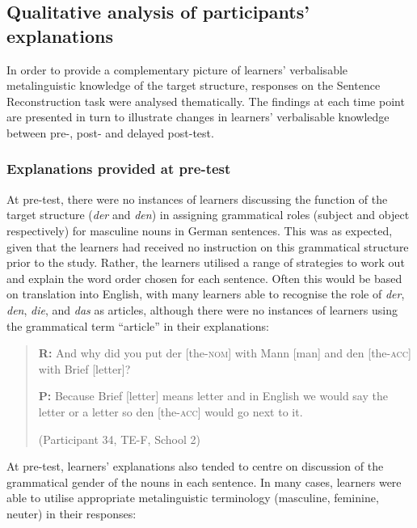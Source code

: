 \documentclass[output=paper]{langscibook}
\begin{document}
\subsection{Qualitative analysis of participants’ explanations}\largerpage[2]

In order to provide a complementary picture of learners’ verbalisable metalinguistic knowledge of the target structure, responses on the Sentence Reconstruction task were analysed thematically. The findings at each time point are presented in turn to illustrate changes in learners’ verbalisable knowledge between pre-, post- and delayed post-test.

\subsubsection{Explanations provided at pre-test}

At pre-test, there were no instances of learners discussing the function of the target structure (\textit{der} and \textit{den}) in assigning grammatical roles (subject and object respectively) for masculine nouns in German sentences. This was as expected, given that the learners had received no instruction on this grammatical structure prior to the study. Rather, the learners utilised a range of strategies to work out and explain the word order chosen for each sentence. Often this would be based on translation into English, with many learners able to recognise the role of \textit{der}, \textit{den}, \textit{die}, and \textit{das} as articles, although there were no instances of learners using the grammatical term ``article'' in their explanations:

\begin{quote}
  \textbf{R:} And why did you put der [the-\textsc{nom}] with Mann [man] and   den [the-\textsc{acc}] with Brief [letter]?   

  \textbf{P:} Because Brief [letter] means letter and in English we would   say the letter or a letter so den [the-\textsc{acc}] would go next to it. 

(Participant 34, TE-F, School 2)
\end{quote}

\begin{sloppypar}
At pre-test, learners’ explanations also tended to centre on discussion of the grammatical gender of the nouns in each sentence. In many cases, learners were able to utilise appropriate metalinguistic terminology (masculine, feminine, neuter) in their responses:
\end{sloppypar}
\end{document}
